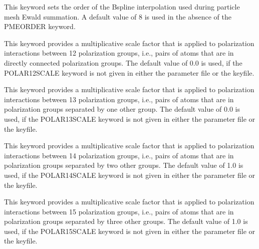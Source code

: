\documentclass[letterpaper,11pt,english]{sphinxmanual}
\begin{document}
  This keyword sets the order of the B\sphinxhyphen{}spline interpolation used during particle mesh Ewald summation. A default value of 8 is used in the absence of the PME\sphinxhyphen{}ORDER keyword.


  This keyword provides a multiplicative scale factor that is applied to polarization interactions between 1\sphinxhyphen{}2 polarization groups, i.e., pairs of atoms that are in directly connected polarization groups. The default value of 0.0 is used, if the POLAR\sphinxhyphen{}12\sphinxhyphen{}SCALE keyword is not given in either the parameter file or the keyfile.


  This keyword provides a multiplicative scale factor that is applied to polarization interactions between 1\sphinxhyphen{}3 polarization groups, i.e., pairs of atoms that are in polarization groups separated by one other group. The default value of 0.0 is used, if the POLAR\sphinxhyphen{}13\sphinxhyphen{}SCALE keyword is not given in either the parameter file or the keyfile.


  This keyword provides a multiplicative scale factor that is applied to polarization interactions between 1\sphinxhyphen{}4 polarization groups, i.e., pairs of atoms that are in polarization groups separated by two other groups. The default value of 1.0 is used, if the POLAR\sphinxhyphen{}14\sphinxhyphen{}SCALE keyword is not given in either the parameter file or the keyfile.


  This keyword provides a multiplicative scale factor that is applied to polarization interactions between 1\sphinxhyphen{}5 polarization groups, i.e., pairs of atoms that are in polarization groups separated by three other groups. The default value of 1.0 is used, if the POLAR\sphinxhyphen{}15\sphinxhyphen{}SCALE keyword is not given in either the parameter file or the keyfile.
\end{document}
